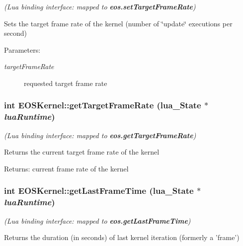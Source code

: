 {\em (Lua binding interface: mapped to {\bf eos.setTargetFrameRate})\/}\par
\par
 Sets the target frame rate of the kernel (number of \char`\"{}update\char`\"{} executions per second) 

\begin{Desc}
\item[Parameters:]
\begin{description}
\item[{\em targetFrameRate}]requested target frame rate \end{description}
\end{Desc}
\hypertarget{structEOSKernel_38b029c0f4c889658b15b1fd87404934}{
\subsubsection[{getTargetFrameRate}]{\setlength{\rightskip}{0pt plus 5cm}int EOSKernel::getTargetFrameRate (lua\_\-State $\ast$ {\em luaRuntime})}}
\label{structEOSKernel_38b029c0f4c889658b15b1fd87404934}


{\em (Lua binding interface: mapped to {\bf eos.getTargetFrameRate})\/}\par
\par
 Returns the current target frame rate of the kernel 

\begin{Desc}
\item[Returns:]current frame rate of the kernel \end{Desc}
\hypertarget{structEOSKernel_d47c8cea2665110c5da64b2af16e49ac}{
\subsubsection[{getLastFrameTime}]{\setlength{\rightskip}{0pt plus 5cm}int EOSKernel::getLastFrameTime (lua\_\-State $\ast$ {\em luaRuntime})}}
\label{structEOSKernel_d47c8cea2665110c5da64b2af16e49ac}


{\em (Lua binding interface: mapped to {\bf eos.getLastFrameTime})\/}\par
\par
 Returns the duration (in seconds) of last kernel iteration (formerly a 'frame') 

